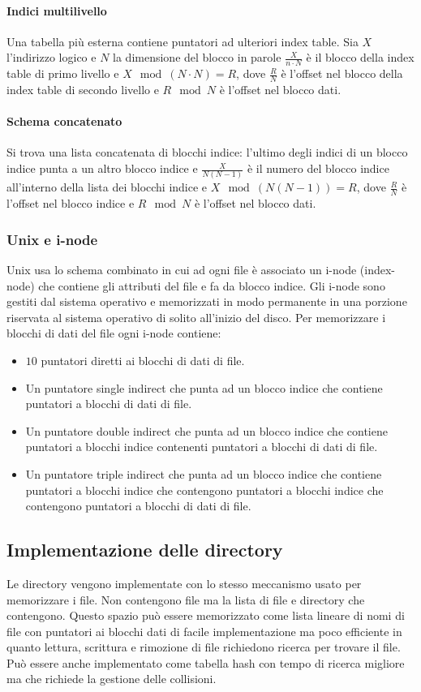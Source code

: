 \paragraph{Indici multilivello} Una tabella pi\`u esterna contiene puntatori ad ulteriori index table. Sia $X$ l'indirizzo logico e $N$ la dimensione del blocco in parole 
$\frac{X}{n\cdot N}$ \`e il blocco della index table di primo livello e $X\mod (N\cdot N) = R$, dove $\frac{R}{N}$ \`e l'offset nel blocco della index table di secondo livello e 
$R\mod N$ \`e l'offset nel blocco dati.
\paragraph{Schema concatenato} Si trova una lista concatenata di blocchi indice: l'ultimo degli indici di un blocco indice punta a un altro blocco indice e $\frac{X}{N(N-1)}$ \`e il 
numero del blocco indice all'interno della lista dei blocchi indice e $X\mod(N(N-1)) = R$, dove $\frac{R}{N}$ \`e l'offset nel blocco indice e $R\mod N$ \`e l'offset nel blocco dati. 
\subsubsection{Unix e i-node}
Unix usa lo schema combinato in cui ad ogni file \`e associato un i-node (index-node) che contiene gli attributi del file e fa da blocco indice. Gli i-node sono gestiti dal sistema 
operativo e memorizzati in modo permanente in una porzione riservata al sistema operativo di solito all'inizio del disco. Per memorizzare i blocchi di dati del file ogni i-node contiene:
\begin{itemize}
	\item $10$ puntatori diretti ai blocchi di dati di file.
	\item Un puntatore single indirect che punta ad un blocco indice che contiene puntatori a blocchi di dati di file.
	\item Un puntatore double indirect che punta ad un blocco indice che contiene puntatori a blocchi indice contenenti puntatori a blocchi di dati di file.
	\item Un puntatore triple indirect che punta ad un blocco indice che contiene puntatori a blocchi indice che contengono puntatori a blocchi indice che contengono puntatori a
		blocchi di dati di file. 
\end{itemize}
\subsection{Implementazione delle directory}
Le directory vengono implementate con lo stesso meccanismo usato per memorizzare i file. Non contengono file ma la lista di file e directory che contengono. Questo spazio pu\`o essere
memorizzato come lista lineare di nomi di file con puntatori ai blocchi dati di facile implementazione ma poco efficiente in quanto lettura, scrittura e rimozione di file richiedono 
ricerca per trovare il file. Pu\`o essere anche implementato come tabella hash con tempo di ricerca migliore ma che richiede la gestione delle collisioni. 
